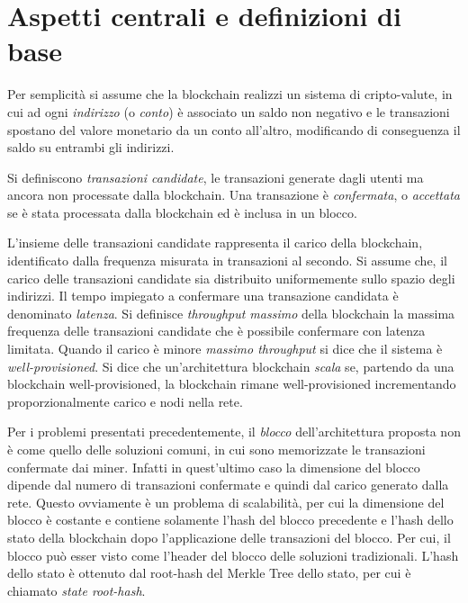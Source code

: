 \section{Aspetti centrali e definizioni di base}


Per semplicità si assume che la blockchain realizzi un sistema di cripto-valute, in cui ad ogni \emph{indirizzo} (o \emph{conto}) è associato un saldo non negativo e le transazioni spostano del valore monetario da un conto all'altro, modificando di conseguenza il saldo su entrambi gli indirizzi.

Si definiscono \emph{transazioni candidate}, le transazioni generate dagli utenti ma ancora non processate dalla blockchain. Una transazione è \emph{confermata}, o \emph{accettata} se è stata processata dalla blockchain ed è inclusa in un blocco.

L'insieme delle transazioni candidate rappresenta il carico della blockchain, identificato dalla frequenza misurata in transazioni al secondo. Si assume che, il carico delle transazioni candidate sia distribuito uniformemente sullo spazio degli indirizzi. Il tempo impiegato a confermare una transazione candidata è denominato \emph{latenza}. Si definisce \emph{throughput massimo} della blockchain la massima frequenza delle transazioni candidate che è possibile confermare con latenza limitata. Quando il carico è minore \emph{massimo throughput} si dice che il sistema è \emph{well-provisioned}.
Si dice che un'architettura blockchain \emph{scala} se, partendo da una blockchain well-provisioned, la blockchain rimane well-provisioned incrementando proporzionalmente carico e nodi nella rete.


Per i problemi presentati precedentemente, il \textit{blocco} dell'architettura proposta non è come quello delle soluzioni comuni, in cui sono memorizzate le transazioni confermate dai miner. Infatti in quest'ultimo caso la dimensione del blocco dipende dal numero di transazioni confermate e quindi dal carico generato dalla rete. Questo ovviamente è un problema di scalabilità, per cui la dimensione del blocco è costante e contiene solamente l'hash del blocco precedente e l'hash dello stato della blockchain dopo l'applicazione delle transazioni del blocco. Per cui, il blocco può esser visto come l'header del blocco delle soluzioni tradizionali. L'hash dello stato è ottenuto dal root-hash del Merkle Tree dello stato, per cui è chiamato \emph{state root-hash}.

